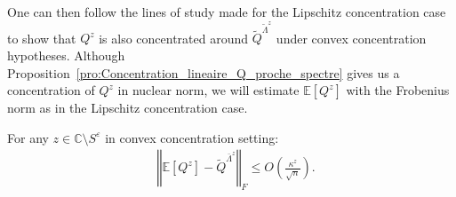 \documentclass[a4papaer, titlepage]{book}
\begin{document}
One can then follow the lines of study made for the Lipschitz concentration case to show that $Q^z$ is also concentrated around $\tilde Q^{\tilde \Lambda^z}$ under convex concentration hypotheses. 
Although Proposition~\ref{pro:Concentration_lineaire_Q_proche_spectre} gives us a concentration of $Q^z$ in nuclear norm, we will estimate $\mathbb E[Q^z]$ with the Frobenius norm as in the Lipschitz concentration case. 
\begin{proposition}\label{pro:first_deterministic_equivalent}
  For any $z \in \mathbb C \setminus S^\varepsilon$ in convex concentration setting:
  \begin{align*}
    &\left\Vert \mathbb E[Q^z] - \tilde Q^{\bar \Lambda^z} \right\Vert_F \leq O \left( \frac{\kappa^z}{\sqrt n} \right).
  \end{align*}
\end{proposition}
\end{document}
